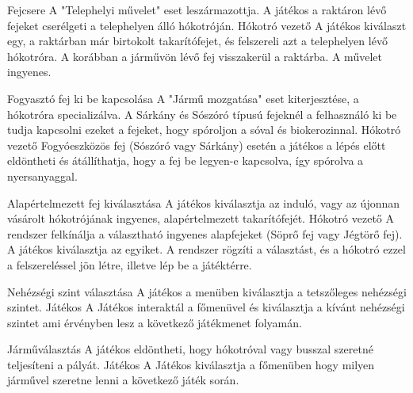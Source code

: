 \begin{use-case}
    {Fejcsere}
    {A "Telephelyi művelet" eset leszármazottja. A játékos a raktáron lévő fejeket cserélgeti a telephelyen álló hókotróján.}
    {Hókotró vezető}
    A játékos kiválaszt egy, a raktárban már birtokolt takarítófejet, és felszereli azt a telephelyen lévő hókotróra. A korábban a járművön lévő fej visszakerül a raktárba. A művelet ingyenes.
\end{use-case}

\begin{use-case}
    {Fogyasztó fej ki be kapcsolása}
    {A "Jármű mozgatása" eset kiterjesztése, a hókotróra specializálva. A Sárkány és Sószóró típusú fejeknél a felhasználó ki be tudja kapcsolni ezeket a fejeket, hogy spóroljon a sóval és biokerozinnal.}
    {Hókotró vezető}
   	Fogyóeszközös fej (Sószóró vagy Sárkány) esetén a játékos a lépés előtt eldöntheti és átállíthatja, hogy a fej be legyen-e kapcsolva, így spórolva a nyersanyaggal.
\end{use-case}

\begin{use-case}
    {Alapértelmezett fej kiválasztása}
    {A játékos kiválasztja az induló, vagy az újonnan vásárolt hókotrójának ingyenes, alapértelmezett takarítófejét.}
    {Hókotró vezető}
	A rendszer felkínálja a választható ingyenes alapfejeket (Söprő fej vagy Jégtörő fej). A játékos kiválasztja az egyiket. A rendszer rögzíti a választást, és a hókotró ezzel a felszereléssel jön létre, illetve lép be a játéktérre.
\end{use-case}

\begin{use-case}
{Nehézségi szint választása}
{A játékos a menüben kiválasztja a tetszőleges nehézségi szintet.}
{Játékos}
A Játékos interaktál a főmenüvel és kiválasztja a kívánt nehézségi szintet ami érvényben lesz a következő játékmenet folyamán.
\end{use-case}

\begin{use-case}
{Járműválasztás}
{A játékos eldöntheti, hogy hókotróval vagy busszal szeretné teljesíteni a pályát.}
{Játékos}
A Játékos kiválasztja a főmenüben hogy milyen járművel szeretne lenni a következő játék során. 
\end{use-case}

